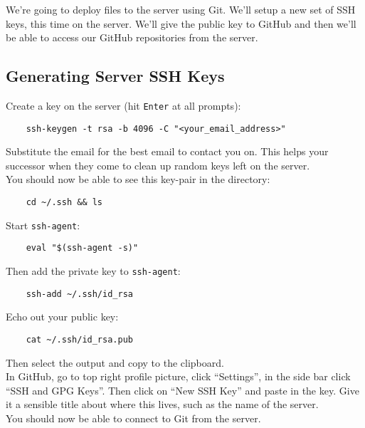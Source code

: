 We're going to deploy files to the server using Git. We'll setup a new set of SSH keys, this time on the server. We'll give the public key to GitHub and then we'll be able to access our GitHub repositories from the server.


\subsection{Generating Server SSH Keys}

Create a key on the server (hit \texttt{Enter} at all prompts):

\begin{verbatim}
    ssh-keygen -t rsa -b 4096 -C "<your_email_address>"
\end{verbatim}

Substitute the email for the best email to contact you on. This helps your successor when they come to clean up random keys left on the server.
\\


You should now be able to see this key-pair in the directory:

\begin{verbatim}
    cd ~/.ssh && ls
\end{verbatim}

Start \texttt{ssh-agent}:

\begin{verbatim}
    eval "$(ssh-agent -s)"
\end{verbatim}

Then add the private key to \texttt{ssh-agent}:

\begin{verbatim}
    ssh-add ~/.ssh/id_rsa
\end{verbatim}

Echo out your public key:

\begin{verbatim}
    cat ~/.ssh/id_rsa.pub
\end{verbatim}

Then select the output and copy to the clipboard.
\\

In GitHub, go to top right profile picture, click ``Settings'', in the side bar click ``SSH and GPG Keys''. Then click on ``New SSH Key'' and paste in the key. Give it a sensible title about where this lives, such as the name of the server.
\\

You should now be able to connect to Git from the server.


